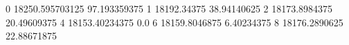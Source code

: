 0 18250.595703125 97.193359375
1 18192.34375 38.94140625
2 18173.8984375 20.49609375
4 18153.40234375 0.0
6 18159.8046875 6.40234375
8 18176.2890625 22.88671875
